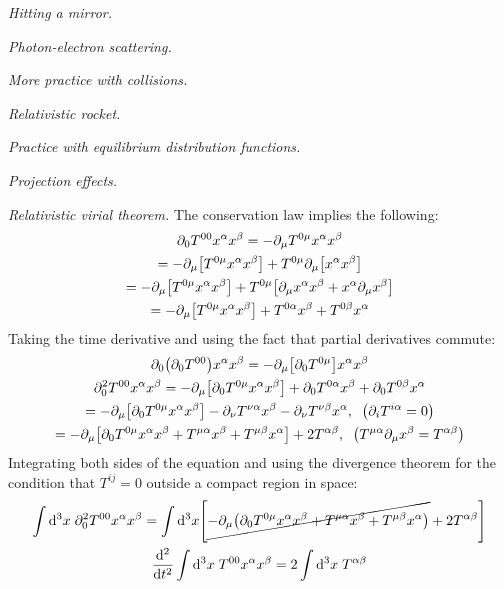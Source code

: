 \documentclass{report}
\begin{document}
\begin{subquests}
	\item \emph{Hitting a mirror.}

	\item \emph{Photon-electron scattering.}

	\item \emph{More practice with collisions.}

	\item \emph{Relativistic rocket.}

	\item \emph{Practice with equilibrium distribution functions.}

	\item \emph{Projection effects.}

	\item \emph{Relativistic virial theorem.}
	The conservation law implies the following:
	\begin{gather*}
		\partial_0 T^{00}x^{\alpha}x^{\beta} = -\partial_{\mu}T^{0\mu}x^{\alpha}x^{\beta} \\
		= -\partial_{\mu}\bqty{T^{0\mu}x^{\alpha}x^{\beta}} + T^{0\mu}\partial_{\mu}\bqty{x^{\alpha}x^{\beta}} \\
		= -\partial_{\mu}\bqty{T^{0\mu}x^{\alpha}x^{\beta}} + T^{0\mu}\bqty{\partial_{\mu}x^{\alpha}x^{\beta} + x^{\alpha}\partial_{\mu}x^{\beta}} \\
		=  -\partial_{\mu}\bqty{T^{0\mu}x^{\alpha}x^{\beta}} + T^{0\alpha}x^{\beta} + T^{0\beta}x^{\alpha}
	\end{gather*}
	Taking the time derivative and using the fact that partial derivatives commute:
	\begin{gather*}
		\partial_0\pqty{\partial_0 T^{00}}x^{\alpha}x^{\beta} = -\partial_{\mu}\bqty{\partial_0 T^{0\mu}}x^{\alpha}x^{\beta} \\
		\partial^2_0 T^{00}x^{\alpha}x^{\beta} = -\partial_{\mu}\bqty{\partial_0 T^{0\mu}x^{\alpha}x^{\beta}} + \partial_0 T^{0\alpha}x^{\beta} + \partial_0 T^{0\beta}x^{\alpha} \\
		= -\partial_{\mu}\bqty{\partial_0 T^{0\mu}x^{\alpha}x^{\beta}} - \partial_{\nu}T^{\nu\alpha}x^{\beta} - \partial_{\nu}T^{\nu\beta}x^{\alpha}, \;\; \pqty{\partial_i T^{i\alpha} = 0} \\
		= -\partial_{\mu}\bqty{\partial_0 T^{0\mu}x^{\alpha}x^{\beta} + T^{\mu\alpha}x^{\beta} + T^{\mu\beta}x^{\alpha}} + 2 T^{\alpha\beta}, \;\; \pqty{T^{\mu\alpha}\partial_{\mu}x^{\beta} = T^{\alpha\beta}}
	\end{gather*}
	Integrating both sides of the equation and using the divergence theorem for the condition that $T^{ij} = 0$ outside a compact region in space:
	\begin{gather*}
		\int \dd^3{x}\;\partial^2_0 T^{00} x^{\alpha}x^{\beta} = \int \dd^3{x} \bqty{ \cancel{-\partial_{\mu}\pqty{\partial_0 T^{0\mu}x^{\alpha}x^{\beta} + T^{\mu\alpha}x^{\beta} + T^{\mu\beta}x^{\alpha}}} + 2 T^{\alpha\beta}} \\
		\dv[2]{t}\int \dd^3{x}\;T^{00} x^{\alpha} x^{\beta} = 2 \int \dd^3{x}\; T^{\alpha\beta}
	\end{gather*}


\end{subquests}
\end{document}
